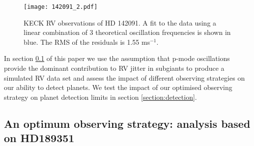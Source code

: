 \documentclass[useAMS, usenatbib]{aastex}
\begin{document}
\begin{figure*}
\begin{center}
\texttt{[image: 142091\_2.pdf]}
\caption{KECK RV observations of HD 142091. A fit to the data using a linear
combination of 3 theoretical oscillation frequencies is shown in blue. The RMS
of the residuals is 1.55 ms$^{-1}$.}
\label{fig:k2_2}
\end{center}
\end{figure*}

In section \textsection \ref{section:method} of this paper we use the
assumption that p-mode oscillations provide the dominant contribution to RV
jitter in subgiants to produce a simulated RV data set and assess the impact
of different observing strategies on our ability to detect planets.
We test the impact of our optimised observing strategy on planet detection
limits in section \textsection \ref{section:detection}.


\subsection{An optimum observing strategy: analysis based on HD189351}
\label{section:method}
\end{document}
